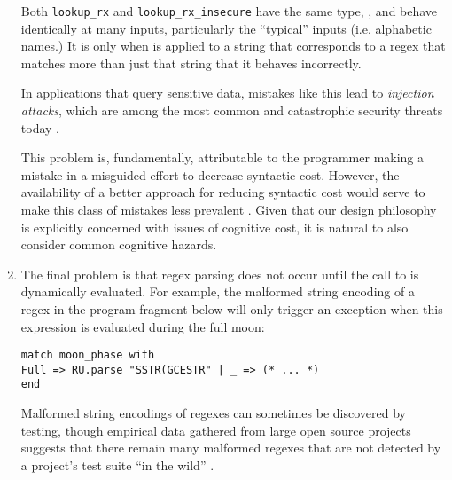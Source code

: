 \begin{enumerate}
Both \lstinline{lookup_rx} and \lstinline{lookup_rx_insecure} have the same type, , and behave identically at many inputs, particularly the ``typical'' inputs (i.e. alphabetic names.) It is only when  is applied to a string that corresponds to a regex that matches more than just that string that it behaves incorrectly. 

In applications that query sensitive data, mistakes like this lead to \emph{injection attacks}, which are among the most common and catastrophic security threats today \cite{owasp2013}.

This problem is, fundamentally, attributable to the programmer making a mistake in a misguided effort to decrease syntactic cost. However, the availability of a better approach for reducing syntactic cost would serve to make this class of mistakes less prevalent \cite{Bravenboer:2007:PIA:1289971.1289975}. Given that our design philosophy is explicitly concerned with issues of cognitive cost, it is natural to also consider common cognitive hazards.



\item The final problem is that regex parsing does not occur until the call to  is dynamically evaluated. For example, the malformed string encoding of a regex in the program fragment below will only trigger an exception when this expression is evaluated during the full moon: %

\begin{lstlisting}[numbers=none]
match moon_phase with 
Full => RU.parse "SSTR(GCESTR" | _ => (* ... *)
end
\end{lstlisting}
Malformed string encodings of regexes can sometimes be discovered by testing, though empirical data gathered from large open source projects suggests that there remain many malformed regexes that are not detected by a project's test suite ``in the wild'' \cite{spishak2012type}.


\end{enumerate}
